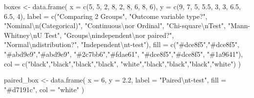 \documentclass[
  12pt,
  letterpaper,
]{book}
\newenvironment{Shaded}{\begin{snugshade}}{\end{snugshade}}
\newcommand{\AttributeTok}[1]{\textcolor[rgb]{0.40,0.45,0.13}{#1}}
\newcommand{\DecValTok}[1]{\textcolor[rgb]{0.68,0.00,0.00}{#1}}
\newcommand{\FloatTok}[1]{\textcolor[rgb]{0.68,0.00,0.00}{#1}}
\newcommand{\FunctionTok}[1]{\textcolor[rgb]{0.28,0.35,0.67}{#1}}
\newcommand{\NormalTok}[1]{\textcolor[rgb]{0.00,0.23,0.31}{#1}}
\newcommand{\OtherTok}[1]{\textcolor[rgb]{0.00,0.23,0.31}{#1}}
\newcommand{\SpecialCharTok}[1]{\textcolor[rgb]{0.37,0.37,0.37}{#1}}
\newcommand{\StringTok}[1]{\textcolor[rgb]{0.13,0.47,0.30}{#1}}
\begin{document}
\begin{Shaded}
\begin{Highlighting}[]
\NormalTok{boxes }\OtherTok{\textless{}{-}} \FunctionTok{data.frame}\NormalTok{(}
  \AttributeTok{x =} \FunctionTok{c}\NormalTok{(}\DecValTok{5}\NormalTok{, }\DecValTok{5}\NormalTok{, }\DecValTok{2}\NormalTok{, }\DecValTok{8}\NormalTok{, }\DecValTok{2}\NormalTok{, }\DecValTok{8}\NormalTok{, }\DecValTok{6}\NormalTok{, }\DecValTok{8}\NormalTok{, }\DecValTok{6}\NormalTok{),}
  \AttributeTok{y =} \FunctionTok{c}\NormalTok{(}\DecValTok{9}\NormalTok{, }\DecValTok{7}\NormalTok{, }\DecValTok{5}\NormalTok{, }\FloatTok{5.5}\NormalTok{, }\DecValTok{3}\NormalTok{, }\DecValTok{3}\NormalTok{, }\FloatTok{6.5}\NormalTok{, }\FloatTok{6.5}\NormalTok{, }\DecValTok{4}\NormalTok{),}
  \AttributeTok{label =} \FunctionTok{c}\NormalTok{(}\StringTok{"Comparing 2 Groups"}\NormalTok{,}
            \StringTok{"Outcome variable type?"}\NormalTok{,}
            \StringTok{"Nominal}\SpecialCharTok{\textbackslash{}n}\StringTok{(Categorical)"}\NormalTok{,}
            \StringTok{"Continuous}\SpecialCharTok{\textbackslash{}n}\StringTok{or Ordinal"}\NormalTok{,}
            \StringTok{"Chi{-}square}\SpecialCharTok{\textbackslash{}n}\StringTok{Test"}\NormalTok{,}
            \StringTok{"Mann{-}Whitney}\SpecialCharTok{\textbackslash{}n}\StringTok{U Test"}\NormalTok{,}
            \StringTok{"Groups}\SpecialCharTok{\textbackslash{}n}\StringTok{independent}\SpecialCharTok{\textbackslash{}n}\StringTok{or paired?"}\NormalTok{,}
            \StringTok{"Normal}\SpecialCharTok{\textbackslash{}n}\StringTok{distribution?"}\NormalTok{,}
            \StringTok{"Independent}\SpecialCharTok{\textbackslash{}n}\StringTok{t{-}test"}\NormalTok{),}
  \AttributeTok{fill =} \FunctionTok{c}\NormalTok{(}\StringTok{"\#dce8f5"}\NormalTok{,}\StringTok{"\#dce8f5"}\NormalTok{,}
           \StringTok{"\#abd9e9"}\NormalTok{,}\StringTok{"\#abd9e9"}\NormalTok{,}
           \StringTok{"\#2c7bb6"}\NormalTok{,}\StringTok{"\#fdae61"}\NormalTok{,}
           \StringTok{"\#dce8f5"}\NormalTok{,}\StringTok{"\#dce8f5"}\NormalTok{,}
           \StringTok{"\#1a9641"}\NormalTok{),}
  \AttributeTok{col =} \FunctionTok{c}\NormalTok{(}\StringTok{"black"}\NormalTok{,}\StringTok{"black"}\NormalTok{,}\StringTok{"black"}\NormalTok{,}\StringTok{"black"}\NormalTok{,}
          \StringTok{"white"}\NormalTok{,}\StringTok{"black"}\NormalTok{,}\StringTok{"black"}\NormalTok{,}\StringTok{"black"}\NormalTok{,}\StringTok{"white"}\NormalTok{)}
\NormalTok{)}

\NormalTok{paired\_box }\OtherTok{\textless{}{-}} \FunctionTok{data.frame}\NormalTok{(}
  \AttributeTok{x =} \DecValTok{6}\NormalTok{, }\AttributeTok{y =} \FloatTok{2.2}\NormalTok{, }\AttributeTok{label =} \StringTok{"Paired}\SpecialCharTok{\textbackslash{}n}\StringTok{t{-}test"}\NormalTok{,}
  \AttributeTok{fill =} \StringTok{"\#d7191c"}\NormalTok{, }\AttributeTok{col =} \StringTok{"white"}
\NormalTok{)}


\end{Highlighting}
\end{Shaded}
\end{document}

